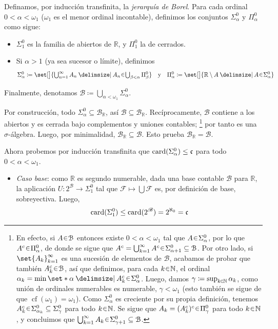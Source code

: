 \begin{sol}
\begin{enumerate}[label=(\alph*)]
Definamos, por inducción transfinita, la \emph{jerarquía de Borel}. Para cada ordinal
$0<\alpha<\omega_1$ ($\omega_1$ es el menor ordinal incontable), definimos los conjuntos $\Sigma^0_\alpha$ y $\Pi^0_\alpha$ como sigue:
\begin{itemize}
    \item $\Sigma^0_1$ es la familia de abiertos de $\mathbb{R}$,
    y $\Pi^0_1$ la de cerrados.
    
    \item Si $\alpha>1$ (ya sea sucesor o límite), definimos
    \[\textstyle
    \Sigma^0_\alpha
    \coloneq
    \set[\big]{\bigcup_{n=1}^\infty A_n \given A_n\en\bigcup_{\beta<\alpha}\Pi^0_\beta}
    \quad\text{y}\quad
    \Pi^0_\alpha
    \coloneq
    \set[\big]{\mathbb{R}\setminus A \given A\en\Sigma^0_\alpha}
    \]
\end{itemize}
Finalmente, denotamos $\mathcal{B}\coloneq\bigcup_{\alpha<\omega_1}\Sigma^0_\alpha$.\par
Por construcción, todo $\Sigma^0_\alpha \subseteq \mathcal{B}_\mathbb{R}$, así $\mathcal{B} \subseteq \mathcal{B}_\mathbb{R}$. Recíprocamente, $\mathcal{B}$ contiene a los abiertos y es cerrada
bajo complementos y uniones contables;%
\footnote{
    En efecto, si $A\en \mathcal{B}$ entonces existe $0<\alpha<\omega_1$ tal que $A\en\Sigma^0_\alpha$, por lo que $A^c\en\Pi^0_\alpha$, de donde se sigue que $A^c = \bigcup^\infty_{k=1}A^c \en \Sigma^0_{\alpha+1} \subseteq \mathcal{B}$. Por otro lado, si $\set{A_k}^\infty_{k=1}$ es una sucesión de elementos de $\mathcal{B}$, acabamos de probar que también $A^c_k\en\mathcal{B}$, así que definimos, para cada $k\en\mathbb{N}$, el ordinal $\alpha_k = \min\set*{\alpha \given A^c_k\en \Sigma^0_\alpha}$. Luego, damos $\gamma \coloneq \sup_{k\en\mathbb{N}}\alpha_k$, como unión de ordinales numerables es numerable, $\gamma < \omega_1$ (esto también se sigue de que $\operatorname{cf}(\omega_1) = \omega_1$). Como $\Sigma^0_\alpha$ es creciente por su propia definición, tenemos $A^c_k \en \Sigma^0_{\alpha_k}\subseteq \Sigma^0_\gamma$ para todo $k\en\mathbb{N}$. Se sigue que $A_k = (A^c_k)^c\en\Pi^0_\gamma$ para todo $k\en\mathbb{N}$, y concluimos que $\bigcup^\infty_{k=1}A_k\en\Sigma^0_{\gamma+1} \subseteq\mathcal{B}$.
}
por tanto es una $\sigma$-álgebra.
Luego, por minimalidad, $\mathcal{B}_\mathbb{R}\subseteq\mathcal{B}$. Esto prueba $\mathcal{B}_\mathbb{R}=\mathcal{B}$.\par
Ahora probemos por inducción transfinita que $\operatorname{card}(\Sigma^0_\alpha)\le\mathfrak{c}$ para todo $0<\alpha<\omega_1$.
\begin{itemize}
    \item\emph{Caso base}: como $\mathbb{R}$ es segundo numerable, dada una base contable $\mathscr{B}$ para $\mathbb{R}$, la aplicación $U \colon 2^\mathscr{B} \to \Sigma^0_1$ tal que $\mathcal{F} \mapsto \bigcup\mathcal{F}$ es, por definición de base, sobreyectiva. Luego, 
    \[
    \operatorname{card}(\Sigma^0_1) \leq \operatorname{card}(2^\mathscr{B}) = 2^{\aleph_0} =\mathfrak{c}
    \]


\end{itemize}
\end{enumerate}
\end{sol}
